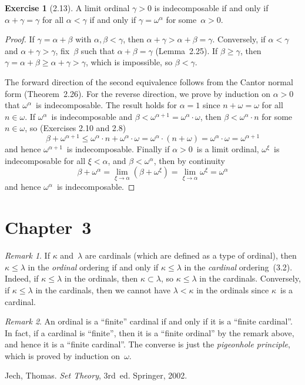 \documentclass[letterpaper,12pt]{article}
\newcommand{\mult}{\cdot}
\theoremstyle{definition}
\newtheorem*{exer}{Exercise}
\theoremstyle{remark}
\newtheorem*{rmk}{Remark}
\begin{document}
\begin{exer}[2.13]
A limit ordinal \(\gamma>0\) is indecomposable if and only if \(\alpha+\gamma=\gamma\) for all \(\alpha<\gamma\) if and only if \(\gamma=\omega^{\alpha}\) for some~\(\alpha>0\).
\end{exer}
\begin{proof}
If \(\gamma=\alpha+\beta\) with \(\alpha,\beta<\gamma\), then \(\alpha+\gamma>\alpha+\beta=\gamma\). Conversely, if \(\alpha<\gamma\) and \(\alpha+\gamma>\gamma\), fix~\(\beta\) such that \(\alpha+\beta=\gamma\) (Lemma~2.25). If \(\beta\ge\gamma\), then \(\gamma=\alpha+\beta\ge\alpha+\gamma>\gamma\), which is impossible, so \(\beta<\gamma\).

The forward direction of the second equivalence follows from the Cantor normal form (Theorem~2.26). For the reverse direction, we prove by induction on \(\alpha>0\) that \(\omega^{\alpha}\)~is indecomposable. The result holds for \(\alpha=1\) since \(n+\omega=\omega\) for all \(n\in\omega\). If \(\omega^{\alpha}\)~is indecomposable and \(\beta<\omega^{\alpha+1}=\omega^{\alpha}\mult\omega\), then \(\beta<\omega^{\alpha}\mult n\) for some \(n\in\omega\), so (Exercises 2.10 and 2.8)
\[\beta+\omega^{\alpha+1}\le\omega^{\alpha}\mult n+\omega^{\alpha}\mult\omega=\omega^{\alpha}\mult(n+\omega)=\omega^{\alpha}\mult\omega=\omega^{\alpha+1}\]
and hence \(\omega^{\alpha+1}\)~is indecomposable. Finally if \(\alpha>0\)~is a limit ordinal, \(\omega^{\xi}\)~is indecomposable for all \(\xi<\alpha\), and \(\beta<\omega^{\alpha}\), then by continuity
\[\beta+\omega^{\alpha}=\lim_{\xi\to\alpha}(\beta+\omega^{\xi})=\lim_{\xi\to\alpha}\omega^{\xi}=\omega^{\alpha}\]
and hence \(\omega^{\alpha}\)~is indecomposable.
\end{proof}

\section*{Chapter~3}
\begin{rmk}
If \(\kappa\) and~\(\lambda\) are cardinals (which are defined as a type of ordinal), then \(\kappa\le\lambda\) in the \emph{ordinal} ordering if and only if \(\kappa\le\lambda\) in the \emph{cardinal} ordering~(3.2). Indeed, if \(\kappa\le\lambda\) in the ordinals, then \(\kappa\subset\lambda\), so \(\kappa\le\lambda\) in the cardinals. Conversely, if \(\kappa\le\lambda\) in the cardinals, then we cannot have \(\lambda<\kappa\) in the ordinals since \(\kappa\)~is a cardinal.
\end{rmk}

\begin{rmk}
An ordinal is a ``finite'' cardinal if and only if it is a ``finite cardinal''. In fact, if a cardinal is ``finite'', then it is a ``finite ordinal'' by the remark above, and hence it is a ``finite cardinal''. The converse is just the \emph{pigeonhole principle}, which is proved by induction on~\(\omega\).
\end{rmk}

\begin{thebibliography}{0}
 Jech, Thomas. \textit{Set Theory}, 3rd~ed. Springer, 2002.
\end{thebibliography}
\end{document}
